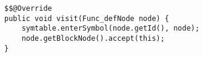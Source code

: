 \begin{lstlisting}[caption={Visit method for FuncDefNode in FuncStructureVisitor}, label={FuncDefNode}]
$$@Override
public void visit(Func_defNode node) {
    symtable.enterSymbol(node.getId(), node);
    node.getBlockNode().accept(this);
}
\end{lstlisting}
